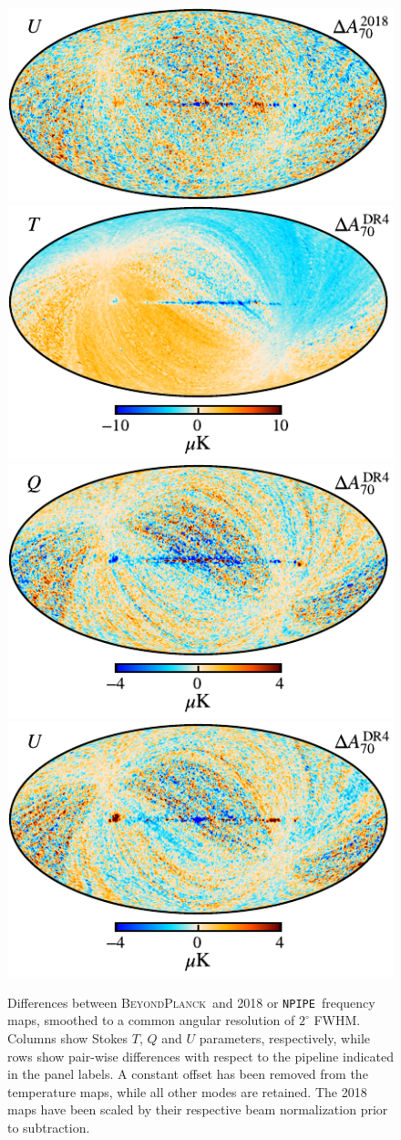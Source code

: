 \documentclass[twocolumn]{aa}
\newcommand{\BP}{\textsc{BeyondPlanck}}
\newcommand{\npipe}[0]{\texttt{NPIPE}}
\begin{document}
\begin{figure}[p]
  \includegraphics[width=0.33\linewidth]{figs/BP_070_diff_dx12_v2_U_DIFF_w8_n1024_c-planck.pdf}\\
  \includegraphics[width=0.33\linewidth]{figs/BP_070_diff_npipe_v2_I_DIFF_w8_n1024_cb_c-planck.pdf}
  \includegraphics[width=0.33\linewidth]{figs/BP_070_diff_npipe_v2_Q_DIFF_w8_n1024_cb_c-planck.pdf}
  \includegraphics[width=0.33\linewidth]{figs/BP_070_diff_npipe_v2_U_DIFF_w8_n1024_cb_c-planck.pdf}\\
  \caption{Differences between \BP\ and 2018 or \npipe\ frequency
    maps, smoothed to a common angular resolution of $2^{\circ}$
    FWHM. Columns show Stokes $T$, $Q$ and $U$ parameters,
    respectively, while rows show pair-wise differences with respect
    to the pipeline indicated in the panel labels. A constant offset
    has been removed from the temperature maps, while all other modes
    are retained. The 2018 maps have been scaled by their respective
    beam normalization prior to subtraction.
  }\label{fig:freqdiff}
\end{figure}
\end{document}
